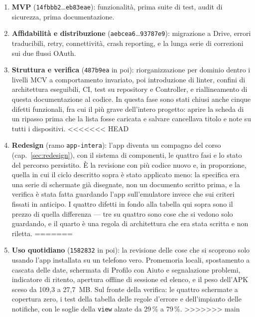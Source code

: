 \documentclass[11pt,a4paper]{report}
\begin{document}
\begin{enumerate}[nosep]
  \item \textbf{MVP} (\texttt{14fbbb2}\dots\texttt{eb83eae}): funzionalit\`a,
        prima suite di test, audit di sicurezza, prima documentazione.
  \item \textbf{Affidabilit\`a e distribuzione}
        (\texttt{aebcea6}\dots\texttt{93787e9}): migrazione a Drive, errori
        traducibili, retry, connettivit\`a, crash reporting, e la lunga serie
        di correzioni sui due flussi OAuth.
  \item \textbf{Struttura e verifica} (\texttt{487b9ea} in poi):
        riorganizzazione per dominio dentro i livelli MCV a comportamento
        invariato, poi introduzione di linter, confini di architettura
        eseguibili, CI, test su repository e Controller, e riallineamento di
        questa documentazione al codice. In questa fase sono stati chiusi anche
        cinque difetti funzionali, fra cui il pi\`u grave dell'intero progetto:
        aprire la scheda di un ripasso prima che la lista fosse caricata e
        salvare cancellava titolo e note su tutti i dispositivi.
<<<<<<< HEAD
  \item \textbf{Redesign} (ramo \texttt{app-intera}): l'app diventa un compagno
        del corso (cap.~\ref{sec:redesign}), con il sistema di componenti, le
        quattro fasi e lo stato del percorso persistito. \`E la revisione con
        pi\`u codice nuovo e, in proporzione, quella in cui il ciclo descritto
        sopra \`e stato applicato meno: la specifica era una serie di schermate
        gi\`a disegnate, non un documento scritto prima, e la verifica \`e stata
        fatta guardando l'app sull'emulatore invece che sui criteri fissati in
        anticipo. I quattro difetti in fondo alla tabella qui sopra sono il
        prezzo di quella differenza --- tre su quattro sono cose che si vedono
        solo guardando, e il quarto \`e una regola di architettura che era
        stata scritta e non riletta.
=======
  \item \textbf{Uso quotidiano} (\texttt{1582832} in poi): la revisione delle
        cose che si scoprono solo usando l'app installata su un telefono vero.
        Promemoria locali, spostamento a cascata delle date, schermata di
        Profilo con Aiuto e segnalazione problemi, indicatore di ritento,
        apertura offline di sessione ed elenco, e il peso dell'APK sceso da
        109,3 a 27,7~MB. Sul fronte della verifica: le quattro schermate a
        copertura zero, i test della tabella delle regole d'errore e
        dell'impianto delle notifiche, con le soglie della \texttt{view}
        alzate da 29\,\% a 79\,\%.
>>>>>>> main
\end{enumerate}
\end{document}
